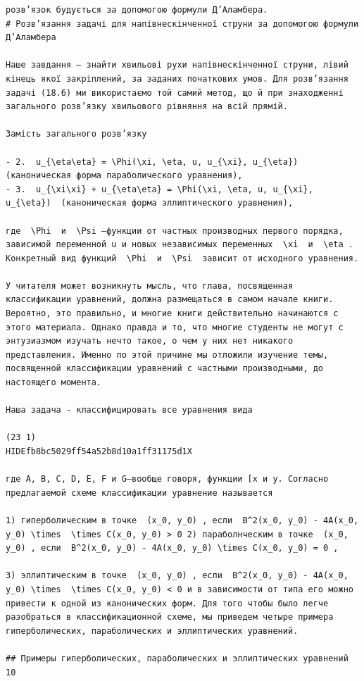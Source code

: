 \documentclass[
  ukrainian,
]{article}
\begin{document}
\begin{verbatim}
розв’язок будується за допомогою формули Д’Аламбера.
# Розв’язання задачі для напівнескінченної струни за допомогою формули Д’Аламбера

Наше завдання — знайти хвильові рухи напівнескінченної струни, лівий кінець якої закріплений, за заданих початкових умов. Для розв’язання задачі (18.6) ми використаємо той самий метод, що й при знаходженні загального розв’язку хвильового рівняння на всій прямій.

Замість загального розв’язку

- 2.  u_{\eta\eta} = \Phi(\xi, \eta, u, u_{\xi}, u_{\eta})  (каноническая форма параболического уравнения),
- 3.  u_{\xi\xi} + u_{\eta\eta} = \Phi(\xi, \eta, u, u_{\xi}, u_{\eta})  (каноническая форма эллиптического уравнения),

где  \Phi  и  \Psi —функции от частных производных первого порядка, зависимой переменной u и новых независимых переменных  \xi  и  \eta . Конкретный вид функций  \Phi  и  \Psi  зависит от исходного уравнения.

У читателя может возникнуть мысль, что глава, посвященная классификации уравнений, должна размещаться в самом начале книги. Вероятно, это правильно, и многие книги действительно начинаются с этого материала. Однако правда и то, что многие студенты не могут с энтузиазмом изучать нечто такое, о чем у них нет никакого представления. Именно по этой причине мы отложили изучение темы, посвященной классификации уравнений с частными производными, до настоящего момента.

Наша задача - классифицировать все уравнения вида

(23 1) 
HIDEfb8bc5029ff54a52b8d10a1ff31175d1X

где A, B, C, D, E, F и G—вообще говоря, функции [x и y. Согласно предлагаемой схеме классификации уравнение называется

1) гиперболическим в точке  (x_0, y_0) , если  B^2(x_0, y_0) - 4A(x_0, y_0) \times  \times C(x_0, y_0) > 0 2) параболнческим в точке  (x_0, y_0) , если  B^2(x_0, y_0) - 4A(x_0, y_0) \times C(x_0, y_0) = 0 ,

3) эллиптическим в точке  (x_0, y_0) , если  B^2(x_0, y_0) - 4A(x_0, y_0) \times  \times C(x_0, y_0) < 0 и в зависимости от типа его можно привести к одной из канонических форм. Для того чтобы было легче разобраться в классификационной схеме, мы приведем четыре примера гиперболических, параболических и эллиптических уравнений.

## Примеры гиперболических, параболических и эллиптических уравнений 10


\end{verbatim}
\end{document}
